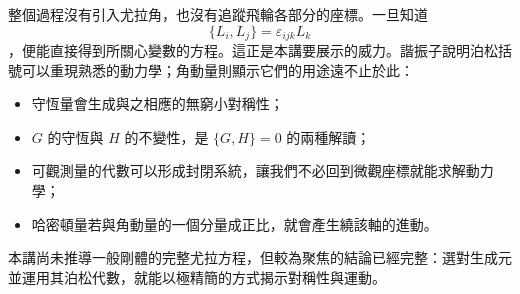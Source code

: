 整個過程沒有引入尤拉角，也沒有追蹤飛輪各部分的座標。一旦知道 \[
  \{L_i,L_j\}=\varepsilon_{ijk}L_k
\]，便能直接得到所關心變數的方程。這正是本講要展示的威力。諧振子說明泊松括號可以重現熟悉的動力學；角動量則顯示它們的用途遠不止於此：
\begin{itemize}
  \item 守恆量會生成與之相應的無窮小對稱性；
  \item  \(G\) 的守恆與 \(H\) 的不變性，是 \(\{G,H\}=0\) 的兩種解讀；
  \item 可觀測量的代數可以形成封閉系統，讓我們不必回到微觀座標就能求解動力學；
  \item 哈密頓量若與角動量的一個分量成正比，就會產生繞該軸的進動。
\end{itemize}
本講尚未推導一般剛體的完整尤拉方程，但較為聚焦的結論已經完整：選對生成元並運用其泊松代數，就能以極精簡的方式揭示對稱性與運動。